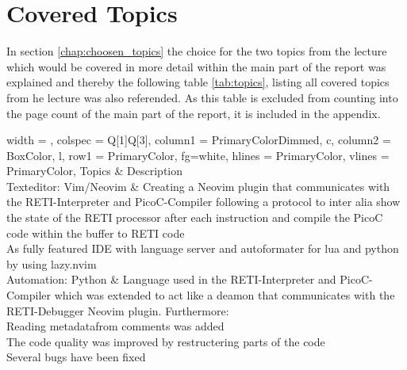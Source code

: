 \documentclass{report}
\begin{document}
\section{Covered Topics}

In section \ref{chap:choosen_topics} the choice for the two topics from the lecture which would be covered in more detail within the main part of the report was explained and thereby the following table \ref{tab:topics}, listing all covered topics from he lecture was also referended. As this table is excluded from counting into the page count of the main part of the report, it is included in the appendix.

\begin{table}[H]
	\centering
	\begin{tblr}{
		width = \linewidth,
		colspec = {Q[1]Q[3]},
		column{1} = {PrimaryColorDimmed, c},
		column{2} = {BoxColor, l},
		row{1} = {PrimaryColor, fg=white},
		hlines = {PrimaryColor},
		vlines = {PrimaryColor},
		}
		Topics                 & Description                                                                                                                                                                                                                                                                                          \\
		Texteditor: Vim/Neovim & {\hspace{\dimexpr\labelsep+0.5\tabcolsep}Creating a Neovim plugin that communicates with the RETI-Interpreter and PicoC-Compiler following a protocol to inter alia show the state of the RETI processor after each instruction and compile the PicoC code within the buffer to RETI code \\\hspace{\dimexpr\labelsep+0.5\tabcolsep}As fully featured IDE with language server and autoformater for lua and python by using lazy.nvim} \\
		Automation: Python     & {\hspace{\dimexpr\labelsep+0.5\tabcolsep}Language used in the RETI-Interpreter and PicoC-Compiler which was extended to act like a deamon that communicates with the RETI-Debugger Neovim plugin. Furthermore:                                                                            \\\hspace*{0.5\leftmargin}\hspace{\dimexpr\labelsep+0.5\tabcolsep}Reading metadatafrom comments was added\\\hspace*{0.5\leftmargin}\hspace{\dimexpr\labelsep+0.5\tabcolsep}The code quality was improved by restructering parts of the code\\\hspace*{0.5\leftmargin}\hspace{\dimexpr\labelsep+0.5\tabcolsep}Several bugs have been fixed}                                                                                                                                                                                                                \\

\end{tblr}
\end{table}
\end{document}
